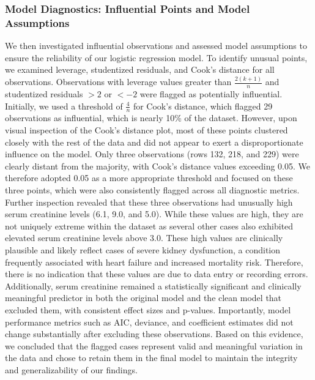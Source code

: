 \documentclass[
  letterpaper,
  DIV=11,
  numbers=noendperiod]{scrartcl}
\begin{document}
\hypertarget{model-diagnostics-influential-points-and-model-assumptions}{%
\subsubsection{Model Diagnostics: Influential Points and Model
Assumptions}\label{model-diagnostics-influential-points-and-model-assumptions}}

We then investigated influential observations and assessed model
assumptions to ensure the reliability of our logistic regression model.
To identify unusual points, we examined leverage, studentized residuals,
and Cook's distance for all observations. Observations with leverage
values greater than \(\frac{2(k+1)}{n}\) and studentized residuals
\(> 2\) or \(< -2\) were flagged as potentially influential. Initially,
we used a threshold of \(\frac{4}{n}\) for Cook's distance, which
flagged 29 observations as influential, which is nearly 10\% of the
dataset. However, upon visual inspection of the Cook's distance plot,
most of these points clustered closely with the rest of the data and did
not appear to exert a disproportionate influence on the model. Only
three observations (rows 132, 218, and 229) were clearly distant from
the majority, with Cook's distance values exceeding 0.05. We therefore
adopted 0.05 as a more appropriate threshold and focused on these three
points, which were also consistently flagged across all diagnostic
metrics. Further inspection revealed that these three observations had
unusually high serum creatinine levels (6.1, 9.0, and 5.0). While these
values are high, they are not uniquely extreme within the dataset as
several other cases also exhibited elevated serum creatinine levels
above 3.0. These high values are clinically plausible and likely reflect
cases of severe kidney dysfunction, a condition frequently associated
with heart failure and increased mortality risk. Therefore, there is no
indication that these values are due to data entry or recording errors.
Additionally, serum creatinine remained a statistically significant and
clinically meaningful predictor in both the original model and the clean
model that excluded them, with consistent effect sizes and p-values.
Importantly, model performance metrics such as AIC, deviance, and
coefficient estimates did not change substantially after excluding these
observations. Based on this evidence, we concluded that the flagged
cases represent valid and meaningful variation in the data and chose to
retain them in the final model to maintain the integrity and
generalizability of our findings.
\end{document}
